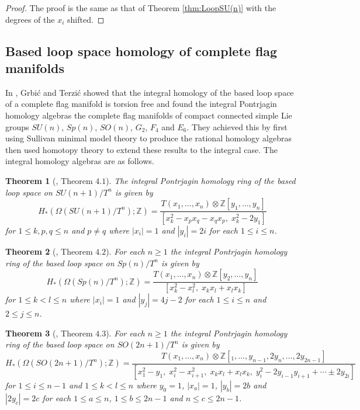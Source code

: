 \documentclass{article}
\theoremstyle{plain}
\newtheorem{thm}{Theorem}[section]
\theoremstyle{definition}
\numberwithin{thm}{section}
\begin{document}
		\begin{proof}
			The proof is the same as that of Theorem \ref{thm:LoopSU(n)} with the degrees of the $x_i$ shifted. 
		\end{proof}
		

	\subsection{Based loop space homology of complete flag manifolds}\label{sec:LoopFlag}

	
	In \cite{homology_Lflags}, Grbi{\'c} and Terzi{\'c} showed that the integral homology of the based loop space of a complete flag manifold is torsion free
	and found the integral Pontrjagin homology algebras the complete flag manifolds of compact connected simple Lie groups
	$SU(n)$, $Sp(n)$, $SO(n)$, $G_2$, $F_4$ and $E_6$.
	They achieved this by first using Sullivan minimal model theory to produce the rational homology algebras
	then used homotopy theory to extend these results to the integral case.
	The integral homology algebras are as follows.

	\begin{thm}[\cite{homology_Lflags}, Theorem $4.1$]
		The integral Pontrjagin homology ring of the based loop space on $SU(n+1)/T^n$ is given by
		\begin{equation*}
			H_*(\Omega(SU(n+1)/T^n);\mathbb{Z})=
			\frac{T(x_1,\dots,x_n)\otimes\mathbb{Z}[y_1,\dots,y_n]}
			{[x_k^2-x_px_q-x_qx_p, \;x_k^2-2y_1]}
		\end{equation*}
		for $1\leq k,p,q\leq n$ and $p\neq q$ where $|x_i|=1$ and $|y_i|=2i$ for each $1\leq i \leq n$.
	\end{thm}
	
	\begin{thm}[\cite{homology_Lflags}, Theorem $4.2$]
		For each $n\geq 1$ the integral Pontrjagin homology ring of the based loop space on $Sp(n)/T^n$ is given by
		\begin{equation*}
			H_*(\Omega(Sp(n)/T^n);\mathbb{Z})=
			\frac{T(x_1,\dots,x_n)\otimes\mathbb{Z}[y_2,\dots,y_n]}
			{[x_k^2-x_l^2,\; x_kx_l+x_lx_k]}
		\end{equation*}
		for $1\leq k < l \leq n$ where $|x_i|=1$ and $|y_j|=4j-2$ for each $1\leq i \leq n$ and $2\leq j \leq n$.
	\end{thm}
	
	\begin{thm}[\cite{homology_Lflags}, Theorem $4.3$]
		For each $n\geq 1$ the integral Pontrjagin homology ring of the based loop space on $SO(2n+1)/T^n$ is given by
		\begin{equation*}
			H_*(\Omega(SO(2n+1)/T^n);\mathbb{Z})=
			\frac{T(x_1,\dots,x_n)\otimes\mathbb{Z}[_1,\dots,y_{n-1},2y_n,\dots,2y_{2n-1}]}
			{[x_1^2-y_1, \; x_i^2-x_{i+1}^2, \; x_kx_l+x_lx_k, \; y_i^2-2y_{i-1}y_{i+1}+\cdots\pm2y_{2i}]}
		\end{equation*}
		for $1\leq i\leq n-1$ and $1\leq k<l \leq n$ where $y_0=1$, $|x_a|=1$, $|y_b|=2b$ and $|2y_c|=2c$
		for each $1\leq a \leq n$, $1\leq b \leq 2n-1$ and $n \leq c \leq 2n-1$.
	\end{thm}
	
\end{document}
